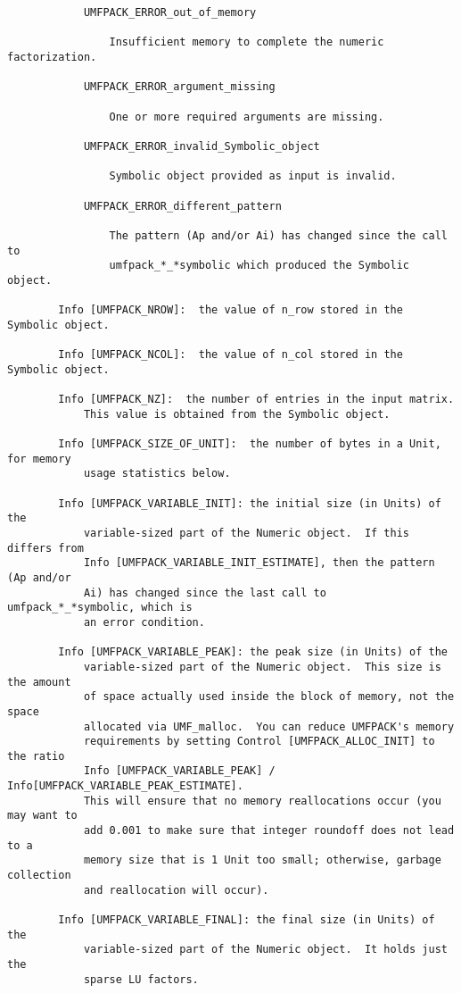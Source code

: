 \documentclass[11pt]{article}
\begin{document}
{\begin{verbatim}
            UMFPACK_ERROR_out_of_memory

                Insufficient memory to complete the numeric factorization.

            UMFPACK_ERROR_argument_missing

                One or more required arguments are missing.

            UMFPACK_ERROR_invalid_Symbolic_object

                Symbolic object provided as input is invalid.

            UMFPACK_ERROR_different_pattern

                The pattern (Ap and/or Ai) has changed since the call to
                umfpack_*_*symbolic which produced the Symbolic object.

        Info [UMFPACK_NROW]:  the value of n_row stored in the Symbolic object.

        Info [UMFPACK_NCOL]:  the value of n_col stored in the Symbolic object.

        Info [UMFPACK_NZ]:  the number of entries in the input matrix.
            This value is obtained from the Symbolic object.

        Info [UMFPACK_SIZE_OF_UNIT]:  the number of bytes in a Unit, for memory
            usage statistics below.

        Info [UMFPACK_VARIABLE_INIT]: the initial size (in Units) of the
            variable-sized part of the Numeric object.  If this differs from
            Info [UMFPACK_VARIABLE_INIT_ESTIMATE], then the pattern (Ap and/or
            Ai) has changed since the last call to umfpack_*_*symbolic, which is
            an error condition.

        Info [UMFPACK_VARIABLE_PEAK]: the peak size (in Units) of the
            variable-sized part of the Numeric object.  This size is the amount
            of space actually used inside the block of memory, not the space
            allocated via UMF_malloc.  You can reduce UMFPACK's memory
            requirements by setting Control [UMFPACK_ALLOC_INIT] to the ratio
            Info [UMFPACK_VARIABLE_PEAK] / Info[UMFPACK_VARIABLE_PEAK_ESTIMATE].
            This will ensure that no memory reallocations occur (you may want to
            add 0.001 to make sure that integer roundoff does not lead to a
            memory size that is 1 Unit too small; otherwise, garbage collection
            and reallocation will occur).

        Info [UMFPACK_VARIABLE_FINAL]: the final size (in Units) of the
            variable-sized part of the Numeric object.  It holds just the
            sparse LU factors.


\end{verbatim}}
\end{document}
